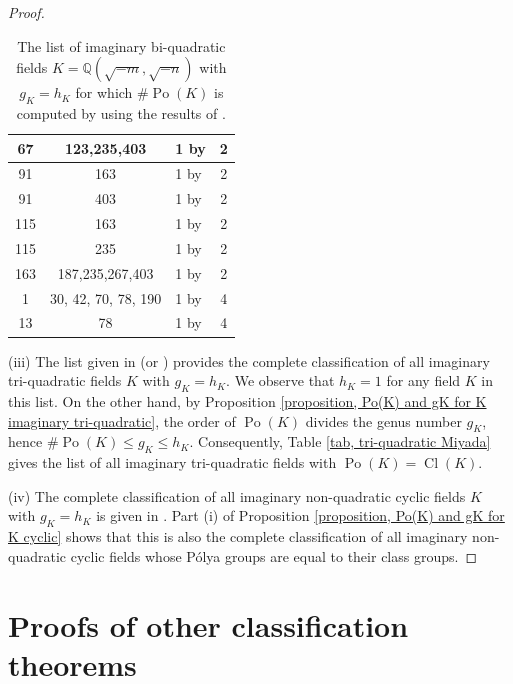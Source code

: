 \documentclass[12pt]{amsart}
\theoremstyle{definition}
\numberwithin{equation}{section}
\DeclareMathOperator{\Po}{Po}
\DeclareMathOperator{\Cl}{Cl}
\begin{document}
\begin{proof}
\begin{table}
\begin{center}
\begin{tabular}{|c |c |l |c|}
		\hline
		67 & 123,235,403 & 1 by \cite[Theorem 5]{TZ} & 2 \\ 
		\hline
		91 & 163 & 1 by \cite[Theorem 5]{TZ} & 2 \\ 
		\hline
		91 & 403 & 1 by \cite[Theorem 7]{TZ} & 2 \\ 
		\hline
		115 & 163 & 1 by \cite[Theorem 5]{TZ} & 2 \\ 
		\hline
		115 & 235 & 1 by \cite[Theorem 7]{TZ} & 2 \\ 
		\hline
		163 & 187,235,267,403 & 1 by \cite[Theorem 5]{TZ} & 2 \\ 
		\hline
		1 & 30, 42, 70, 78, 190 & 1 by \cite[Lemma 6]{TZ} & 4 \\ 
		\hline
		13 & 78 & 1 by \cite[Theorem 5]{TZ} & 4 \\ 
		\hline
	\end{tabular}
	\caption{The list of imaginary bi-quadratic fields  $K=\mathbb{Q}(\sqrt{-m},\sqrt{-n})$ with $g_K=h_K$ for which $\# \Po(K)$ is computed by using the results of \cite{TZ}.}
		 \label{table, TZ}
\end{center}
\end{table}


(iii) The list given in \cite[Table V]{CK} (or \cite[Table 3]{Miyada})
provides the complete classification of all imaginary tri-quadratic fields $K$ with $g_K=h_K$. We observe that $h_K=1$ for any field $K$ in this list. On the other hand, by  Proposition \ref{proposition, Po(K) and gK for K imaginary tri-quadratic}, the order of $\Po(K)$ divides the genus number $g_K$, hence $\# \Po(K) \leq g_K \leq h_K$. Consequently, Table \ref{tab, tri-quadratic Miyada} gives the list of all imaginary tri-quadratic fields with $\Po(K)=\Cl(K)$. 



(iv) The complete classification of all imaginary non-quadratic cyclic fields $K$ with $g_K=h_K$ is given in \cite[Table 1]{CK}. Part (i) of Proposition \ref{proposition, Po(K) and gK for K cyclic}  shows that this is also the complete classification of  all imaginary non-quadratic cyclic fields whose P\'olya groups are equal to their class groups.
\end{proof}
\section{Proofs of other classification theorems}\label{five}
\end{document}

